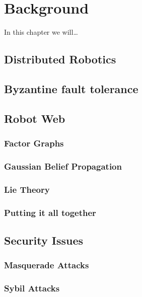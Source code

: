 \chapter{Background}

In this chapter we will\dots

\section{Distributed Robotics}
% 

\section{Byzantine fault tolerance}

\section{Robot Web}
\subsection{Factor Graphs}
\subsection{Gaussian Belief Propagation}
\subsection{Lie Theory}
\subsection{Putting it all together}

\section{Security Issues}
\subsection{Masquerade Attacks}
\subsection{Sybil Attacks}

